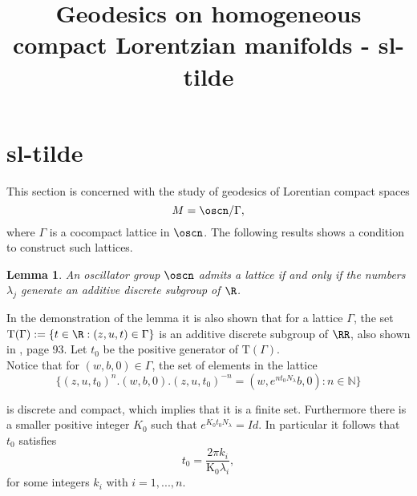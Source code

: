 \documentclass[11pt]{amsart}
\theoremstyle{plain}
\newtheorem{lem}[thm]{Lemma}
\theoremstyle{definition}
\theoremstyle{remark}
\begin{document}
 	
 
\title[Geodesics on compact Lorentzian manifolds]{Geodesics on homogeneous compact Lorentzian manifolds - sl-tilde}

\begin{abstract}
	
\end{abstract}

\author{}

\let\today\relax  %


\maketitle









\section{sl-tilde}\label{sectionosc}

This section is concerned with the study of geodesics of Lorentian compact spaces  $$M=\oscn/ \Gamma,$$ where $\Gamma$ is a cocompact lattice in $\oscn$. The following results shows a condition to construct such lattices. 

\begin{lem}\cite{MeRe}\label{lema_medina}
	An oscillator group $\oscn$ admits a lattice if and only if the numbers $\lambda_j$ generate an additive discrete subgroup of $\R$.
\end{lem}

In the demonstration of the lemma it is also shown that for a lattice $\Gamma$, the set $\mathrm{T}(\Gamma):=\{ t \in \R : (z,u,t) \in \Gamma \}$ is an additive discrete subgroup of $\RR$, also shown in \cite{MF}, page 93. Let $t_0$ be the positive generator of $\mathrm{T}(\Gamma)$. \\

Notice that for $(w,b,0) \in \Gamma$, the set of elements in the lattice
\begin{equation*}
    \{ (z,u,t_0)^n.(w,b,0).(z,u,t_0)^{-n}=(w,e^{n t_0 N_{\lambda}}b,0) : n \in \mathbb{N} \}
\end{equation*}

is discrete and compact, which implies that it is a finite set. Furthermore there is a smaller positive integer $K_0$ such that $e^{K_0 t_0 N_{\lambda}} = Id$. In particular it follows that $t_0$ satisfies
\begin{equation} \label{oscilator-N}
t_0=\frac{2 \pi k_i}{\mathrm{K_0} \lambda_i},
\end{equation}
for some integers $k_i$ with $i=1, ..., n$.\\
\end{document}
